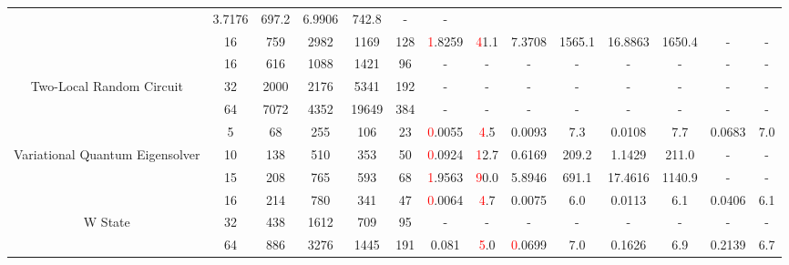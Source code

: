 \begin{table}[htb]
{\begin{tabular}{|c|c|c|c|c|c|c|c|c|c|c|c|c|c|}
 & 3.7176 & 697.2
 & 6.9906 & 742.8
 & - & -
 \\
 & 
16 & 759 & 2982 & 1169 & 128
 & \textcolor{red}1.8259 & \textcolor{red}41.1
 & 7.3708 & 1565.1
 & 16.8863 & 1650.4
 & - & -
 \\
\hline
 & 
16 & 616 & 1088 & 1421 & 96
 & - & -
 & - & -
 & - & -
 & - & -
 \\
Two-Local Random Circuit & 
32 & 2000 & 2176 & 5341 & 192
 & - & -
 & - & -
 & - & -
 & - & -
 \\
 & 
64 & 7072 & 4352 & 19649 & 384
 & - & -
 & - & -
 & - & -
 & - & -
 \\
\hline
 & 
5 & 68 & 255 & 106 & 23
 & \textcolor{red}0.0055 & \textcolor{red}4.5
 & 0.0093 & 7.3
 & 0.0108 & 7.7
 & 0.0683 & 7.0
 \\
Variational Quantum Eigensolver & 
10 & 138 & 510 & 353 & 50
 & \textcolor{red}0.0924 & \textcolor{red}12.7
 & 0.6169 & 209.2
 & 1.1429 & 211.0
 & - & -
 \\
 & 
15 & 208 & 765 & 593 & 68
 & \textcolor{red}1.9563 & \textcolor{red}90.0
 & 5.8946 & 691.1
 & 17.4616 & 1140.9
 & - & -
 \\
\hline
 & 
16 & 214 & 780 & 341 & 47
 & \textcolor{red}0.0064 & \textcolor{red}4.7
 & 0.0075 & 6.0
 & 0.0113 & 6.1
 & 0.0406 & 6.1
 \\
W State & 
32 & 438 & 1612 & 709 & 95
 & - & -
 & - & -
 & - & -
 & - & -
 \\
 & 
64 & 886 & 3276 & 1445 & 191
 & 0.081 & \textcolor{red}5.0
 & \textcolor{red}0.0699 & 7.0
 & 0.1626 & 6.9
 & 0.2139 & 6.7
 \\
\hline
\end{tabular}}
\end{table}
